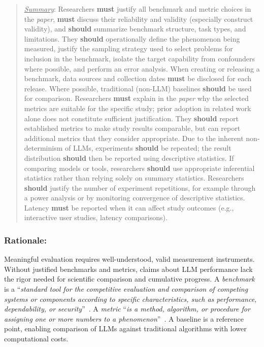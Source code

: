 \documentclass[smallextended]{svjour3}
\newcommand*{\enq}[1]{\enquote{{\itshape#1}}}
\newcommand{\must}{\textbf{must}\xspace}
\newcommand{\should}{\textbf{should}\xspace}
\newcommand{\summary}{\underline{\emph{Summary}}\xspace}
\newcommand{\summary}{\textbf{\emph{Summary}}\xspace}
\newcommand{\paper}{\emph{paper}\xspace}
\newcommand{\paper}{\emph{paper}\xspace}
\newenvironment{framed}{\begin{quote}}{\end{quote}}
\newcommand{\guidelinesubsubsection}[1]{\subsubsection{\bfseries #1:}}
\newcommand{\guidelinesubsubsection}[1]{\subsubsection{#1}}
\begin{document}
\vspace{0.5\baselineskip}
\begin{framed}
\summary: %
Researchers \must justify all benchmark and metric choices in the \paper, \must discuss their reliability and validity (especially construct validity), and \should summarize benchmark structure, task types, and limitations. They \should operationally define the phenomenon being measured, justify the sampling strategy used to select problems for inclusion in the benchmark, isolate the target capability from confounders where possible, and perform an error analysis. When creating or releasing a benchmark, data sources and collection dates \must be disclosed for each release. Where possible, traditional (non-LLM) baselines \should be used for comparison. Researchers \must explain in the \paper why the selected metrics are suitable for the specific study; prior adoption in related work alone does not constitute sufficient justification. They \should report established metrics to make study results comparable, but can report additional metrics that they consider appropriate. Due to the inherent non-determinism of LLMs, experiments \should be repeated; the result distribution \should then be reported using descriptive statistics. If comparing models or tools, researchers \should use appropriate inferential statistics rather than relying solely on summary statistics. Researchers \should justify the number of experiment repetitions, for example through a power analysis or by monitoring convergence of descriptive statistics. Latency \must be reported when it can affect study outcomes (e.g., interactive user studies, latency comparisons).
\end{framed}

\guidelinesubsubsection{Rationale}

Meaningful evaluation requires well-understood, valid measurement instruments.
Without justified benchmarks and metrics, claims about LLM performance lack the rigor needed for scientific comparison and cumulative progress.
A \textit{benchmark} is a \enq{standard tool for the competitive evaluation and comparison of competing systems or components according to specific characteristics, such as performance, dependability, or security}~\cite{DBLP:conf/wosp/KistowskiAHLHC15}. A \textit{metric} \enq{is a method, algorithm, or procedure for assigning one or more numbers to a phenomenon}~\cite{DBLP:books/sp/24/RalphKAA24}. A baseline is a reference point, enabling comparison of LLMs against traditional algorithms with lower computational costs.
\end{document}

